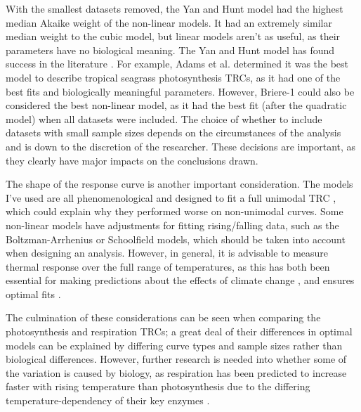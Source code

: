 \documentclass[11pt, a4paper]{article}
\begin{document}
With the smallest datasets removed, the Yan and Hunt model had the highest median Akaike weight of the non-linear models. It had an extremely similar median weight to the cubic model, but linear models aren't as useful, as their parameters have no biological meaning. The Yan and Hunt model has found success in the literature \cite{adamsModelFitBiological2017, vanderheideSimpleEquationDescribing2006}. For example, Adams et al. \cite{adamsModelFitBiological2017} determined it was the best model to describe tropical seagrass photosynthesis TRCs, as it had one of the best fits and biologically meaningful parameters. However, Briere-1 could also be considered the best non-linear model, as it had the best fit (after the quadratic model) when all datasets were included. The choice of whether to include datasets with small sample sizes depends on the circumstances of the analysis and is down to the discretion of the researcher. These decisions are important, as they clearly have major impacts on the conclusions drawn.

The shape of the response curve is another important consideration. The models I've used are all phenomenological and designed to fit a full unimodal TRC \cite{yanEquationModellingTemperature1999, briereNovelRateModel1999}, which could explain why they performed worse on non-unimodal curves. Some non-linear models have adjustments for fitting rising/falling data, such as the Boltzman-Arrhenius \cite{dellSystematicVariationTemperature2011} or Schoolfield  \cite{schoolfieldNonlinearRegressionBiological1981} models, which should be taken into account when designing an analysis. However, in general, it is advisable to measure thermal response over the full range of temperatures, as this has both been essential for making predictions about the effects of climate change  \cite{hueyWhyTropicalForest2009}, and ensures optimal fits \cite{dellSystematicVariationTemperature2011}.

The culmination of these considerations can be seen when comparing the photosynthesis and respiration TRCs; a great deal of their differences in optimal models can be explained by differing curve types and sample sizes rather than biological differences. However, further research is needed into whether some of the variation is caused by biology, as respiration has been predicted to increase faster with rising temperature than photosynthesis due to the differing temperature-dependency of their key enzymes \cite{gutowMarineMesoherbivoreConsumption2016, allenLinkingGlobalCarbon2005}.
\end{document}
